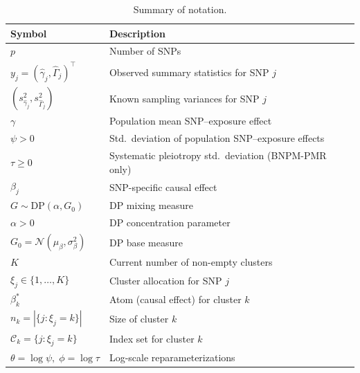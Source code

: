 \documentclass[12pt, a4paper]{article}
\theoremstyle{remark}
\newcommand{\Nor}{\mathcal{N}}
\begin{document}
\begin{table}[h!]
\centering
\small
\caption{Summary of notation.}
\label{tab:notation}
\begin{tabular}{@{}lp{9.5cm}@{}}
\toprule
Symbol & Description \\
\midrule
$p$ & Number of SNPs \\
$y_j = (\hat\gamma_j,\hat\Gamma_j)^\top$ & Observed summary statistics for SNP $j$ \\
$(s^2_{\hat\gamma_j}, s^2_{\hat\Gamma_j})$ & Known sampling variances for SNP $j$ \\
$\gamma$ & Population mean SNP--exposure effect \\
$\psi > 0$ & Std.\ deviation of population SNP--exposure effects \\
$\tau \geq 0$ & Systematic pleiotropy std.\ deviation (BNPM-PMR only) \\
$\beta_j$ & SNP-specific causal effect \\
$G \sim \mathrm{DP}(\alpha, G_0)$ & DP mixing measure \\
$\alpha > 0$ & DP concentration parameter \\
$G_0 = \Nor(\mu_\beta,\sigma_\beta^2)$ & DP base measure \\
$K$ & Current number of non-empty clusters \\
$\xi_j \in \{1,\ldots,K\}$ & Cluster allocation for SNP $j$ \\
$\beta_k^*$ & Atom (causal effect) for cluster $k$ \\
$n_k = |\{j : \xi_j = k\}|$ & Size of cluster $k$ \\
$\mathcal{C}_k = \{j : \xi_j = k\}$ & Index set for cluster $k$ \\
$\theta = \log\psi,\;\phi = \log\tau$ & Log-scale reparameterizations \\
\bottomrule
\end{tabular}
\end{table}
\end{document}
